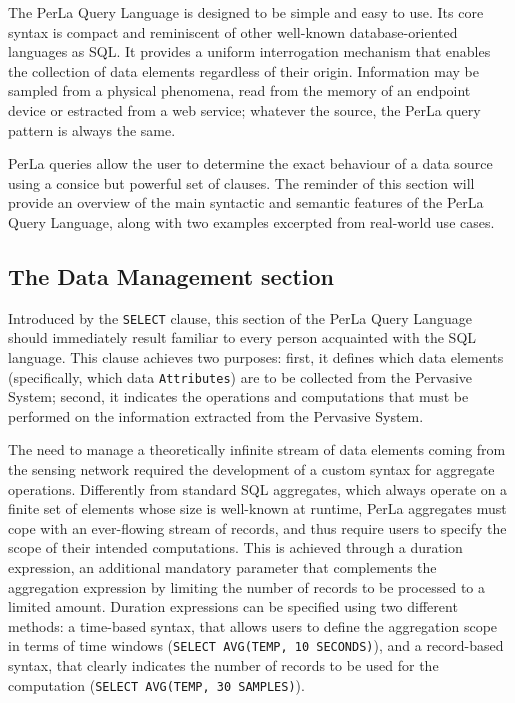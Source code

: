 The PerLa Query Language is designed to be simple and easy to use. Its core
syntax is compact and reminiscent of other well-known database-oriented
languages as SQL. It provides a uniform interrogation mechanism that enables
the collection of data elements regardless of their origin. Information may be
sampled from a physical phenomena, read from the memory of an endpoint device
or estracted from a web service; whatever the source, the PerLa query pattern
is always the same.

PerLa queries allow the user to determine the exact behaviour of a data source
using a consice but powerful set of clauses. The reminder of this section will
provide an overview of the main syntactic and semantic features of the PerLa
Query Language, along with two examples excerpted from real-world use cases.

\subsection{The Data Management section}

Introduced by the \texttt{SELECT} clause, this section of the PerLa Query
Language should immediately result familiar to every person acquainted with the
SQL language. This clause achieves two purposes: first, it defines which data
elements (specifically, which data \texttt{Attributes}) are to be collected
from the Pervasive System; second, it indicates the operations and computations
that must be performed on the information extracted from the Pervasive System.

The need to manage a theoretically infinite stream of data elements coming from
the sensing network required the development of a custom syntax for aggregate
operations. Differently from standard SQL aggregates, which always operate on a
finite set of elements whose size is well-known at runtime, PerLa aggregates
must cope with an ever-flowing stream of records, and thus require users to
specify the scope of their intended computations. This is achieved through a
duration expression, an additional mandatory parameter that complements the
aggregation expression by limiting the number of records to be processed to a
limited amount. Duration expressions can be specified using two different
methods: a time-based syntax, that allows users to define the aggregation scope
in terms of time windows (\lstinline!SELECT AVG(TEMP, 10 SECONDS)!), and a
record-based syntax, that clearly indicates the number of records to be used
for the computation (\lstinline!SELECT AVG(TEMP, 30 SAMPLES)!).

